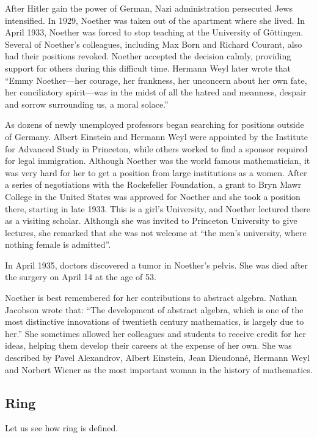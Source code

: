\documentclass[b5paper]{article}
\begin{document}
After Hitler gain the power of German, Nazi administration persecuted Jews intensified. In 1929, Noether was taken out of the apartment where she lived. In April 1933, Noether was forced to stop teaching at the University of Göttingen. Several of Noether's colleagues, including Max Born and Richard Courant, also had their positions revoked. Noether accepted the decision calmly, providing support for others during this difficult time. Hermann Weyl later wrote that ``Emmy Noether—her courage, her frankness, her unconcern about her own fate, her conciliatory spirit—was in the midst of all the hatred and meanness, despair and sorrow surrounding us, a moral solace.''

As dozens of newly unemployed professors began searching for positions outside of Germany. Albert Einstein and Hermann Weyl were appointed by the Institute for Advanced Study in Princeton, while others worked to find a sponsor required for legal immigration. Although Noether was the world famous mathematician, it was very hard for her to get a position from large institutions as a women. After a series of negotiations with the Rockefeller Foundation, a grant to Bryn Mawr College in the United States was approved for Noether and she took a position there, starting in late 1933. This is a girl's University, and Noether lectured there as a visiting scholar. Although she was invited to Princeton University to give lectures, she remarked that she was not welcome at ``the men's university, where nothing female is admitted''.

In April 1935, doctors discovered a tumor in Noether's pelvis. She was died after the surgery on April 14 at the age of 53.

Noether is best remembered for her contributions to abstract algebra. Nathan Jacobson wrote that: ``The development of abstract algebra, which is one of the most distinctive innovations of twentieth century mathematics, is largely due to her.'' She sometimes allowed her colleagues and students to receive credit for her ideas, helping them develop their careers at the expense of her own. She was described by Pavel Alexandrov, Albert Einstein, Jean Dieudonné, Hermann Weyl and Norbert Wiener as the most important woman in the history of mathematics\cite{Wiki-Noether}.

\subsection{Ring}
Let us see how ring is defined.
\end{document}
